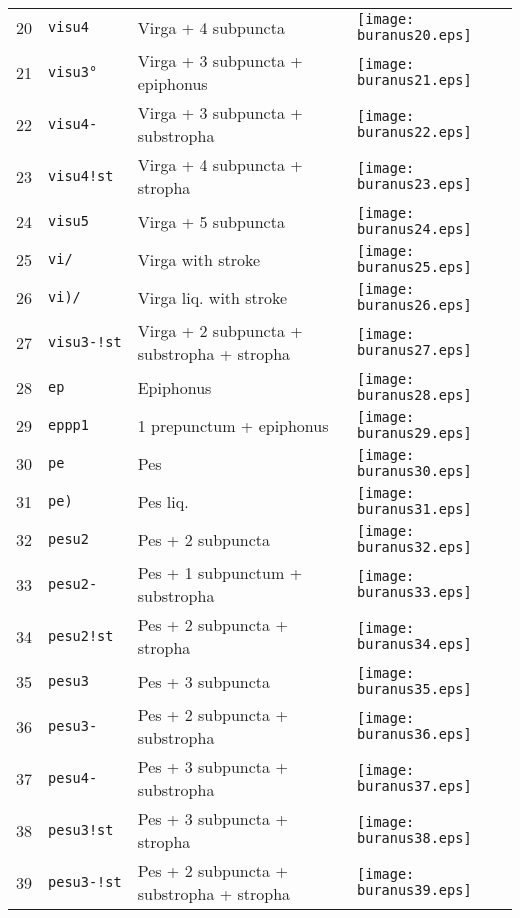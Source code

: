 \documentclass{scrarticle}
\begin{document}
\begin{longtable}{l|l|l|l}
20 & \texttt{visu4} & Virga + 4 subpuncta & \texttt{[image: buranus20.eps]} \\
21 & \texttt{visu3°} & Virga + 3 subpuncta + epiphonus & \texttt{[image: buranus21.eps]} \\
22 & \texttt{visu4-} & Virga + 3 subpuncta + substropha & \texttt{[image: buranus22.eps]} \\
23 & \texttt{visu4!st} & Virga + 4 subpuncta + stropha & \texttt{[image: buranus23.eps]} \\
24 & \texttt{visu5} & Virga + 5 subpuncta & \texttt{[image: buranus24.eps]} \\
25 & \texttt{vi/} & Virga with stroke & \texttt{[image: buranus25.eps]} \\
26 & \texttt{vi)/} & Virga liq. with stroke & \texttt{[image: buranus26.eps]} \\
27 & \texttt{visu3-!st} & Virga + 2 subpuncta + substropha + stropha & \texttt{[image: buranus27.eps]} \\
28 & \texttt{ep} & Epiphonus & \texttt{[image: buranus28.eps]} \\
29 & \texttt{eppp1} & 1 prepunctum + epiphonus & \texttt{[image: buranus29.eps]} \\
30 & \texttt{pe} & Pes & \texttt{[image: buranus30.eps]} \\
31 & \texttt{pe)} & Pes liq. & \texttt{[image: buranus31.eps]} \\
32 & \texttt{pesu2} & Pes + 2 subpuncta & \texttt{[image: buranus32.eps]} \\
33 & \texttt{pesu2-} & Pes + 1 subpunctum + substropha & \texttt{[image: buranus33.eps]} \\
34 & \texttt{pesu2!st} & Pes + 2 subpuncta + stropha & \texttt{[image: buranus34.eps]} \\
35 & \texttt{pesu3} & Pes + 3 subpuncta & \texttt{[image: buranus35.eps]} \\
36 & \texttt{pesu3-} & Pes + 2 subpuncta + substropha & \texttt{[image: buranus36.eps]} \\
37 & \texttt{pesu4-} & Pes + 3 subpuncta + substropha & \texttt{[image: buranus37.eps]} \\
38 & \texttt{pesu3!st} & Pes + 3 subpuncta + stropha & \texttt{[image: buranus38.eps]} \\
39 & \texttt{pesu3-!st} & Pes + 2 subpuncta + substropha + stropha & \texttt{[image: buranus39.eps]} \\

\end{longtable}
\end{document}
